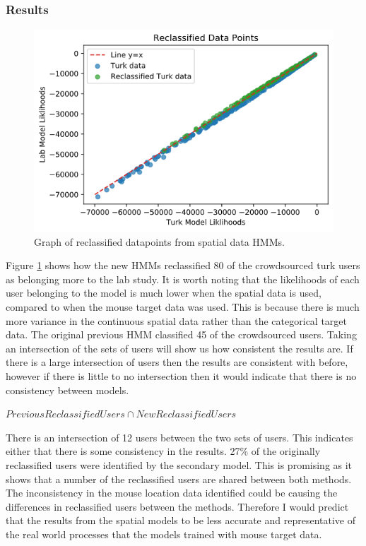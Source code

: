 \documentclass{article}
\begin{document}
\subsubsection{Results}

\begin{figure}[ht!]
    \centering
    \includegraphics[scale=0.5]{Images/Spatial-Reclassified-Data.png}
    \caption{Graph of reclassified datapoints from spatial data HMMs.}
    \label{fig:SpatialRecData}
\end{figure}


Figure \ref{fig:SpatialRecData} shows how the new HMMs reclassified 80 of the crowdsourced turk users as belonging more to the lab study.
It is worth noting that the likelihoods of each user belonging to the model is much lower when the spatial data is used, 
compared to when the mouse target data was used.
This is because there is much more variance in the continuous spatial data rather than the categorical target data.
The original previous HMM classified 45 of the crowdsourced users.
Taking an intersection of the sets of users will show us how consistent the results are.
If there is a large intersection of users then the results are consistent with before, however if there is little to no intersection then it would indicate that there is no consistency between models. 

${Previous Reclassified Users} \cap {New Reclassified Users}$

There is an intersection of 12 users between the two sets of users.
This indicates either that there is some consistency in the results.
27\% of the originally reclassified users were identified by the secondary model. 
This is promising as it shows that a number of the reclassified users are shared between both methods.
The inconsistency in the mouse location data identified could be causing the differences in reclassified users between the methods.
Therefore I would predict that the results from the spatial models to be less accurate and representative of the real world processes that the models trained with mouse target data. 
\end{document}
